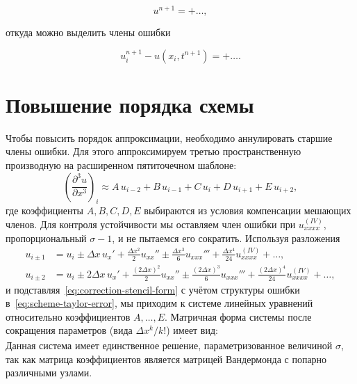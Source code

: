 \documentclass[14pt]{report}
\begin{document}
\begin{dmath}
u^{n + 1} =  + \ldots,
\end{dmath}

откуда можно выделить члены ошибки

\begin{dmath}
u_i^{n + 1} - u(x_i, t^{n + 1}) =  + \ldots.
\label{eq:scheme-taylor-error}
\end{dmath}

\section{Повышение порядка схемы}
Чтобы повысить порядок аппроксимации, необходимо аннулировать старшие члены ошибки. Для этого аппроксимируем третью пространственную производную на расширенном пятиточечном шаблоне:
\begin{equation}
\left(\frac{\partial^3 u}{\partial x^3}\right)_i
\approx A\,u_{i-2} + B\,u_{i-1} + C\,u_i + D\,u_{i+1} + E\,u_{i+2},
\label{eq:correction-stencil-form}
\end{equation}
где коэффициенты $A,B,C,D,E$ выбираются из условия компенсации мешающих членов. Для контроля устойчивости мы оставляем член ошибки при $u^{(IV)}_{xxxx}$, пропорциональный $\sigma - 1$, и не пытаемся его сократить. Используя разложения
\begin{equation*}
\begin{aligned}
u_{i\pm1} &= u_i \pm \Delta x\,u_x' + \frac{\Delta x^2}{2}u_{xx}'' \pm \frac{\Delta x^3}{6}u_{xxx}''' + \frac{\Delta x^4}{24}u^{(IV)}_{xxxx} + \dots,\\
u_{i\pm2} &= u_i \pm 2\Delta x\,u_x' + \frac{(2\Delta x)^2}{2}u_{xx}'' \pm \frac{(2\Delta x)^3}{6}u_{xxx}''' + \frac{(2\Delta x)^4}{24}u^{(IV)}_{xxxx} + \dots,
\end{aligned}
\end{equation*}
и подставляя~\eqref{eq:correction-stencil-form} с учётом структуры ошибки в~\eqref{eq:scheme-taylor-error}, мы приходим к системе линейных уравнений относительно коэффициентов $A,\dots,E$. Матричная форма системы после сокращения параметров (вида $\Delta x^k/k!$) имеет вид:
\begin{equation*}
.
\end{equation*}
Данная система имеет единственное решение, параметризованное величиной $\sigma$, так как матрица коэффициентов является матрицей Вандермонда с попарно различными узлами.
\end{document}
